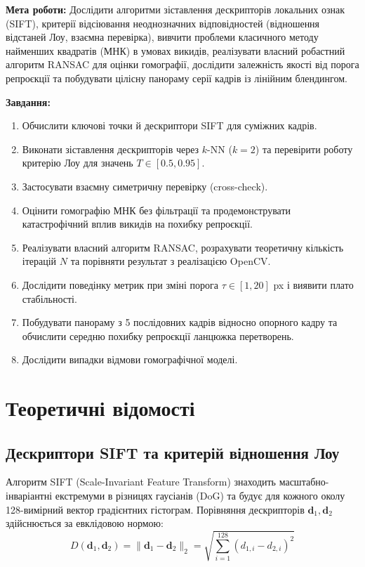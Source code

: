 \documentclass[14pt, a4paper]{article}
\begin{document}
\textbf{Мета роботи:} Дослідити алгоритми зіставлення дескрипторів локальних ознак (SIFT), критерії відсіювання неоднозначних відповідностей (відношення відстаней Лоу, взаємна перевірка), вивчити проблеми класичного методу найменших квадратів (МНК) в умовах викидів, реалізувати власний робастний алгоритм RANSAC для оцінки гомографії, дослідити залежність якості від порога репроєкції та побудувати цілісну панораму серії кадрів із лінійним блендингом.

\textbf{Завдання:}
\begin{enumerate}[label=\arabic*.]
    \item Обчислити ключові точки й дескриптори SIFT для суміжних кадрів.
    \item Виконати зіставлення дескрипторів через $k$-NN ($k=2$) та перевірити роботу критерію Лоу для значень $T \in [0.5, 0.95]$.
    \item Застосувати взаємну симетричну перевірку (cross-check).
    \item Оцінити гомографію МНК без фільтрації та продемонструвати катастрофічний вплив викидів на похибку репроєкції.
    \item Реалізувати власний алгоритм RANSAC, розрахувати теоретичну кількість ітерацій $N$ та порівняти результат з реалізацією OpenCV.
    \item Дослідити поведінку метрик при зміні порога $\tau \in [1, 20]$ px і виявити плато стабільності.
    \item Побудувати панораму з 5 послідовних кадрів відносно опорного кадру та обчислити середню похибку репроєкції ланцюжка перетворень.
    \item Дослідити випадки відмови гомографічної моделі.
\end{enumerate}

\section{Теоретичні відомості}

\subsection{Дескриптори SIFT та критерій відношення Лоу}
Алгоритм SIFT (Scale-Invariant Feature Transform) знаходить масштабно-інваріантні екстремуми в різницях гаусіанів (DoG) та будує для кожного околу 128-вимірний вектор градієнтних гістограм. Порівняння дескрипторів $\mathbf{d}_1, \mathbf{d}_2$ здійснюється за евклідовою нормою:
\begin{equation}
    D(\mathbf{d}_1, \mathbf{d}_2) = \|\mathbf{d}_1 - \mathbf{d}_2\|_2 = \sqrt{\sum_{i=1}^{128} (d_{1,i} - d_{2,i})^2}
\end{equation}
\end{document}
